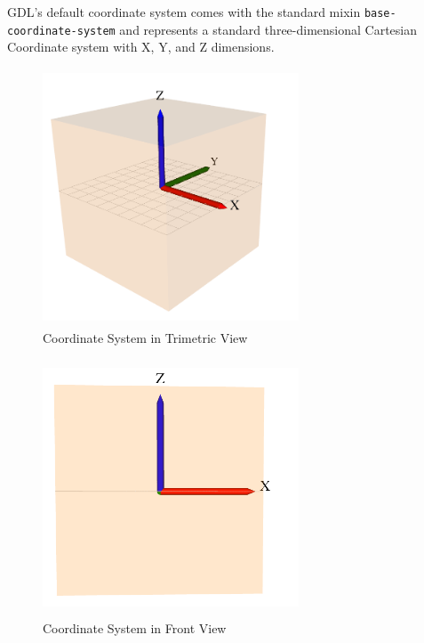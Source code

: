 \documentclass [11pt]{book}
\begin{document}
\label{sec:thedefaultcoordinatesystemingdl}



GDL's default coordinate system comes with the standard mixin \texttt{base-coordinate-system} and represents a standard three-dimensional Cartesian
	 Coordinate system with X, Y, and Z dimensions.


\begin{figure}
\begin{center}
\includegraphics[width=3in,height=3in]{../images/coord-sys-tri.png}
\end{center}

\caption{Coordinate System in Trimetric View}

\label{fig:coord-sys-tri}

\end{figure}

\begin{figure}
\begin{center}
\includegraphics[width=3in,height=3in]{../images/coord-sys-front.png}
\end{center}

\caption{Coordinate System in Front View}

\label{fig:coord-sys-front}

\end{figure}
\end{document}
